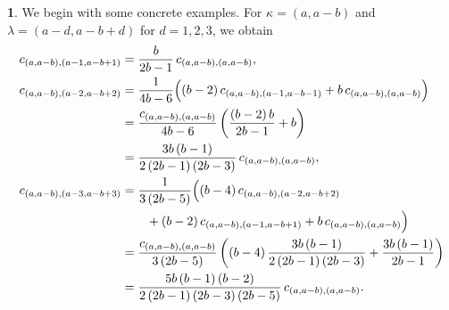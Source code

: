 \documentclass[10pt,oneside,american]{amsart}
\numberwithin{equation}{section}
\numberwithin{figure}{section}
\theoremstyle{plain}
\theoremstyle{definition}
\theoremstyle{remark}
\theoremstyle{plain}
\theoremstyle{definition}
\newtheorem{example}[thm]{\protect\examplename}
\theoremstyle{plain}
\theoremstyle{plain}
\providecommand{\examplename}{Example}
\begin{document}
\begin{example}\label{ex:twoparts}
We begin with some concrete examples.  For $\kappa=(a,a-b)$ and
$\lambda=\left(a-d,a-b+d\right)$ for $d=1,2,3$, we obtain
\begin{align*}
  c_{\left(a,a-b\right),\left(a-1,a-b+1\right)} &= \frac{b}{2b-1}\,c_{\left(a,a-b\right),\left(a,a-b\right)}, \\
  c_{\left(a,a-b\right),\left(a-2,a-b+2\right)} &=
    \frac{1}{4b-6}\Bigl((b-2)\,c_{(a,a-b),(a-1,a-b-1)}+b\,c_{(a,a-b),(a,a-b)}\Bigr) \\
  &= \frac{c_{\left(a,a-b\right),\left(a,a-b\right)}}{4b-6}\left(\frac{\left(b-2\right)b}{2b-1}+b\right) \\
  &= \frac{3b\left(b-1\right)}{2\left(2b-1\right)\left(2b-3\right)}\,c_{(a,a-b),(a,a-b)}, \\
  c_{\left(a,a-b\right),\left(a-3,a-b+3\right)} &=
    \frac{1}{3\left(2b-5\right)}\Bigl(\left(b-4\right)c_{(a,a-b),(a-2,a-b+2)} \\
    &\qquad +\left(b-2\right)c_{(a,a-b),(a-1,a-b+1)}+b\, c_{(a,a-b),(a,a-b)}\Bigr)\\
  &= \frac{c_{\left(a,a-b\right),\left(a,a-b\right)}}{3\left(2b-5\right)}
    \left(\left(b-4\right)\frac{3b\left(b-1\right)}{2\left(2b-1\right)\left(2b-3\right)}+\frac{3b\left(b-1\right)}{2b-1}\right)\\
  &= \frac{5b\left(b-1\right)\left(b-2\right)}{2\left(2b-1\right)\left(2b-3\right)\left(2b-5\right)}\,c_{(a,a-b),(a,a-b)}.
\end{align*}
\end{example}
\end{document}
